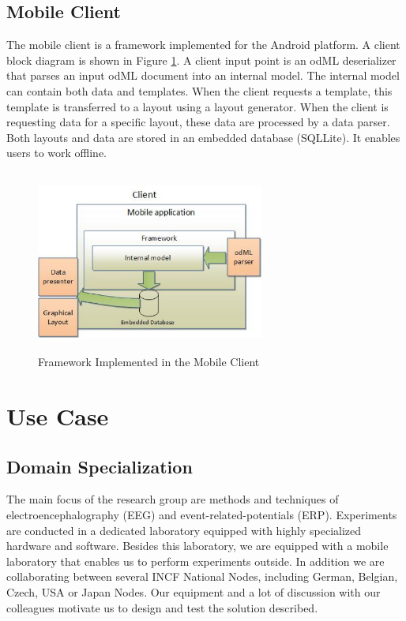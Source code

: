 \documentclass[a4paper,twoside]{article}
\begin{document}
\subsection{Mobile Client}

The mobile client is a framework implemented for the Android platform. A client block diagram is shown in Figure \ref{client}. A client input point is an odML deserializer that parses an input odML document into an internal model. The internal model can contain both data and templates. When the client requests a template, this template is transferred to a layout using a layout generator. When the client is requesting data for a specific layout, these data are processed by a data parser. Both layouts and data are stored in an embedded database (SQLLite). It enables users to work offline.

\begin{figure}
\centering\includegraphics[width=7.5cm, height=6cm]{Client}
\caption{\label{client}Framework Implemented in the Mobile Client}

\end{figure}


\section{Use Case}

\subsection{Domain Specialization}

The main focus of the research group are methods and techniques of electroencephalography (EEG) and event-related-potentials (ERP). Experiments are conducted in a dedicated laboratory equipped with highly specialized hardware and software. Besides this laboratory, we are equipped with a mobile laboratory that enables us to perform experiments outside. In addition we are collaborating between several INCF National Nodes, including German, Belgian, Czech, USA or Japan Nodes. Our equipment and a lot of discussion with our colleagues motivate us to design and test the solution described.
\end{document}
